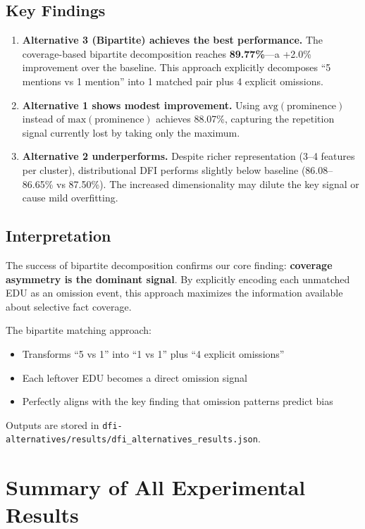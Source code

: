 \documentclass[12pt,a4paper]{article}
\begin{document}
\subsection{Key Findings}

\begin{enumerate}
\item \textbf{Alternative 3 (Bipartite) achieves the best performance.}
      The coverage-based bipartite decomposition reaches \textbf{89.77\%}---a +2.0\% improvement
      over the baseline. This approach explicitly decomposes ``5 mentions vs 1 mention'' into
      1 matched pair plus 4 explicit omissions.

\item \textbf{Alternative 1 shows modest improvement.}
      Using $\text{avg}(\text{prominence})$ instead of $\text{max}(\text{prominence})$ achieves
      88.07\%, capturing the repetition signal currently lost by taking only the maximum.

\item \textbf{Alternative 2 underperforms.}
      Despite richer representation (3--4 features per cluster), distributional DFI performs
      slightly below baseline (86.08--86.65\% vs 87.50\%). The increased dimensionality may
      dilute the key signal or cause mild overfitting.
\end{enumerate}

\subsection{Interpretation}

The success of bipartite decomposition confirms our core finding: \textbf{coverage asymmetry
is the dominant signal}. By explicitly encoding each unmatched EDU as an omission event,
this approach maximizes the information available about selective fact coverage.

The bipartite matching approach:
\begin{itemize}
\item Transforms ``5 vs 1'' into ``1 vs 1'' plus ``4 explicit omissions''
\item Each leftover EDU becomes a direct omission signal
\item Perfectly aligns with the key finding that omission patterns predict bias
\end{itemize}

Outputs are stored in \texttt{dfi-alternatives/results/dfi\_alternatives\_results.json}.

\section{Summary of All Experimental Results}
\end{document}
